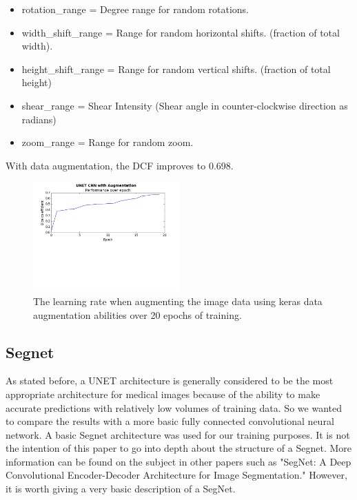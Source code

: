 \documentclass[letterpaper]{article}
\begin{document}
\begin{itemize}
  \item rotation\_range = Degree range for random rotations.
  \item width\_shift\_range =  Range for random horizontal shifts. (fraction of total width). 
  \item height\_shift\_range = Range for random vertical shifts. (fraction of total height)
  \item shear\_range = Shear Intensity (Shear angle in counter-clockwise direction as radians)
  \item zoom\_range = Range for random zoom.
\end{itemize}

With data augmentation, the DCF improves to 0.698.

 \begin{figure}[H]
  \centerline{\includegraphics[width=0.5\textwidth]{Plots/UNETSimple20Augmented.png}}
  \caption{The learning rate when augmenting the image data using keras data augmentation abilities over 20 epochs of training.}
  \label{fig:unet3}
\end{figure}

\subsection{Segnet}
As stated before, a UNET architecture is generally considered to be the most appropriate architecture for medical images because of the ability to make accurate predictions with relatively low volumes of training data. So we wanted to compare the results with a more basic fully connected convolutional neural network. A basic Segnet architecture was used for our training purposes. It is not the intention of this paper to go into depth about the structure of a Segnet. More information can be found on the subject in other papers such as "SegNet: A Deep Convolutional Encoder-Decoder Architecture for Image Segmentation." However, it is worth giving a very basic description of a SegNet. 
\end{document}
